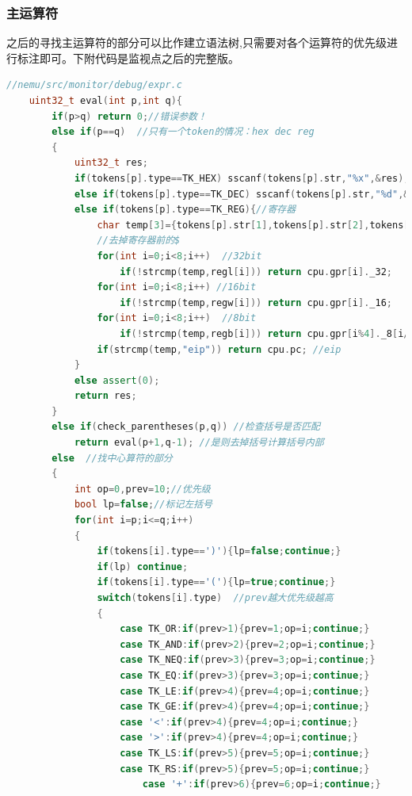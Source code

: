 \documentclass[UTF8,a4paper,10pt]{ctexart}
\begin{document}
{\subsubsection{主运算符}
    之后的寻找主运算符的部分可以比作建立语法树,只需要对各个运算符的优先级进行标注即可。下附代码是监视点之后的完整版。
    \begin{lstlisting}[title=主运算符获取及计算,frame=trbl,language={C++}]
    //nemu/src/monitor/debug/expr.c
    uint32_t eval(int p,int q){
        if(p>q) return 0;//错误参数！
        else if(p==q)  //只有一个token的情况：hex dec reg
        {
            uint32_t res;
            if(tokens[p].type==TK_HEX) sscanf(tokens[p].str,"%x",&res);//16进制
            else if(tokens[p].type==TK_DEC) sscanf(tokens[p].str,"%d",&res);//10进制
            else if(tokens[p].type==TK_REG){//寄存器
                char temp[3]={tokens[p].str[1],tokens[p].str[2],tokens[p].str[3]};
                //去掉寄存器前的$
                for(int i=0;i<8;i++)  //32bit
                    if(!strcmp(temp,regl[i])) return cpu.gpr[i]._32; 
                for(int i=0;i<8;i++) //16bit
                    if(!strcmp(temp,regw[i])) return cpu.gpr[i]._16;
                for(int i=0;i<8;i++)  //8bit
                    if(!strcmp(temp,regb[i])) return cpu.gpr[i%4]._8[i/4];  
                if(strcmp(temp,"eip")) return cpu.pc; //eip
            }
            else assert(0);
            return res;
        }
        else if(check_parentheses(p,q)) //检查括号是否匹配
            return eval(p+1,q-1); //是则去掉括号计算括号内部
        else  //找中心算符的部分
        {
            int op=0,prev=10;//优先级
            bool lp=false;//标记左括号
            for(int i=p;i<=q;i++)
            {
                if(tokens[i].type==')'){lp=false;continue;}
                if(lp) continue;
                if(tokens[i].type=='('){lp=true;continue;}
                switch(tokens[i].type)  //prev越大优先级越高
                {
	                case TK_OR:if(prev>1){prev=1;op=i;continue;}
	                case TK_AND:if(prev>2){prev=2;op=i;continue;}
	                case TK_NEQ:if(prev>3){prev=3;op=i;continue;}
	                case TK_EQ:if(prev>3){prev=3;op=i;continue;}
	                case TK_LE:if(prev>4){prev=4;op=i;continue;}
	                case TK_GE:if(prev>4){prev=4;op=i;continue;}
	                case '<':if(prev>4){prev=4;op=i;continue;}
	                case '>':if(prev>4){prev=4;op=i;continue;}
	                case TK_LS:if(prev>5){prev=5;op=i;continue;}
	                case TK_RS:if(prev>5){prev=5;op=i;continue;}
                        case '+':if(prev>6){prev=6;op=i;continue;}

\end{lstlisting}}
\end{document}
